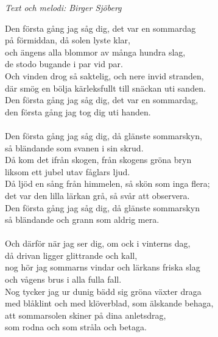 {\footnotesize\textit{Text och melodi: Birger Sjöberg}}\par
\vspace{10pt}
Den första gång jag såg dig, det var en sommardag\\
på förmiddan, då solen lyste klar,\\
och ängens alla blommor av många hundra slag,\\
de stodo bugande i par vid par.\\
Och vinden drog så saktelig, och nere invid stranden,\\
där smög en bölja kärleksfullt till snäckan uti sanden.\\
Den första gång jag såg dig, det var en sommardag,\\
den första gång jag tog dig uti handen.\\
\\
Den första gång jag såg dig, då glänste sommarskyn,\\
så bländande som svanen i sin skrud.\\
Då kom det ifrån skogen, från skogens gröna bryn\\
liksom ett jubel utav fåglars ljud.\\
Då ljöd en sång från himmelen, så skön som inga flera;\\
det var den lilla lärkan grå, så svår att observera.\\
Den första gång jag såg dig, då glänste sommarskyn\\
så bländande och grann som aldrig mera.\\
\\
Och därför när jag ser dig, om ock i vinterns dag,\\
då drivan ligger glittrande och kall,\\
nog hör jag sommarns vindar och lärkans friska slag\\
och vågens brus i alla fulla fall.\\
Nog tycker jag ur dunig bädd sig gröna växter draga\\
med blåklint och med klöverblad, som älskande behaga,\\
att sommarsolen skiner på dina anletsdrag,\\
som rodna och som stråla och betaga.
